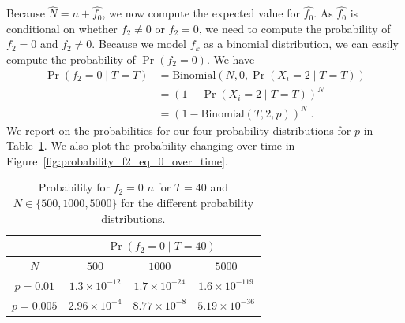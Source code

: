Because $\hat{N} = n + \hat{f_0}$, we now compute the expected value for $\hat{f_0}$.
As $\hat{f_0}$ is conditional on whether $f_2 \neq 0$ or $f_2 = 0$, we need to compute the probability of $f_2 = 0$ and $f_2 \neq 0$.
Because we model $f_k$ as a binomial distribution, we can easily compute the probability of $\Pr(f_2 = 0)$. We have 
\begin{align*}
    \Pr(f_2 = 0 \mid T=T) &= \mathrm{Binomial}(N, 0, \Pr(X_i = 2\mid T=T)) \\
    &= (1 - \Pr(X_i = 2\mid T=T))^N \\
    &= {\left( 1 - \mathrm{Binomial}(T, 2, p) \right)}^N\;.
\end{align*}
We report on the probabilities for our four probability distributions for $p$ in Table~\ref{tab:probability_f2_eq_0}. We also plot the probability changing over time in Figure~\ref{fig:probability_f2_eq_0_over_time}.

\begin{table}[t]
    \centering
    \begin{tabular}{c|c c c}
        \toprule
         & \multicolumn{3}{c}{$\Pr(f_2 = 0 \mid T=40)$} \\
        \midrule
        $N$ & $500$ & $1000$ & $5000$ \\
        \midrule
        $p=0.01$ & $1.3 \times 10^{-12}$ & $1.7 \times 10^{-24}$ & $1.6 \times 10^{-119}$ \\
        $p=0.005$ & $2.96 \times 10^{-4}$ & $8.77 \times 10^{-8}$ & $5.19 \times 10^{-36}$ \\
    \end{tabular}
    \caption{Probability for $f_2 = 0$ $n$ for $T=40$ and $N \in \{500, 1000, 5000\}$ for the different probability distributions.}
    \label{tab:probability_f2_eq_0}
\end{table}





